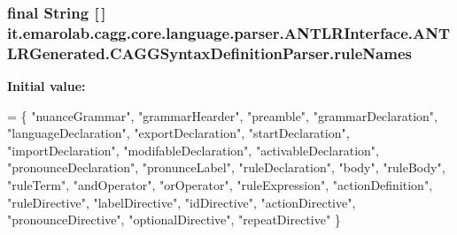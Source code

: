 \hypertarget{classit_1_1emarolab_1_1cagg_1_1core_1_1language_1_1parser_1_1ANTLRInterface_1_1ANTLRGenerated_1_1CAGGSyntaxDefinitionParser_afd9ffca04ae874a3ae506c1d068612dc}{
\subsubsection[{rule\-Names}]{\setlength{\rightskip}{0pt plus 5cm}final String \mbox{[}$\,$\mbox{]} it.\-emarolab.\-cagg.\-core.\-language.\-parser.\-A\-N\-T\-L\-R\-Interface.\-A\-N\-T\-L\-R\-Generated.\-C\-A\-G\-G\-Syntax\-Definition\-Parser.\-rule\-Names\hspace{0.3cm}{\ttfamily [static]}}}\label{classit_1_1emarolab_1_1cagg_1_1core_1_1language_1_1parser_1_1ANTLRInterface_1_1ANTLRGenerated_1_1CAGGSyntaxDefinitionParser_afd9ffca04ae874a3ae506c1d068612dc}
{\bfseries Initial value\-:}
\begin{DoxyCode}
= \{
        \textcolor{stringliteral}{"nuanceGrammar"}, \textcolor{stringliteral}{"grammarHearder"}, \textcolor{stringliteral}{"preamble"}, \textcolor{stringliteral}{"grammarDeclaration"}, \textcolor{stringliteral}{"languageDeclaration"}, 
        \textcolor{stringliteral}{"exportDeclaration"}, \textcolor{stringliteral}{"startDeclaration"}, \textcolor{stringliteral}{"importDeclaration"}, \textcolor{stringliteral}{"modifableDeclaration"}, 
        \textcolor{stringliteral}{"activableDeclaration"}, \textcolor{stringliteral}{"pronounceDeclaration"}, \textcolor{stringliteral}{"pronunceLabel"}, \textcolor{stringliteral}{"ruleDeclaration"}, 
        \textcolor{stringliteral}{"body"}, \textcolor{stringliteral}{"ruleBody"}, \textcolor{stringliteral}{"ruleTerm"}, \textcolor{stringliteral}{"andOperator"}, \textcolor{stringliteral}{"orOperator"}, \textcolor{stringliteral}{"ruleExpression"}, 
        \textcolor{stringliteral}{"actionDefinition"}, \textcolor{stringliteral}{"ruleDirective"}, \textcolor{stringliteral}{"labelDirective"}, \textcolor{stringliteral}{"idDirective"}, 
        \textcolor{stringliteral}{"actionDirective"}, \textcolor{stringliteral}{"pronounceDirective"}, \textcolor{stringliteral}{"optionalDirective"}, \textcolor{stringliteral}{"repeatDirective"}
    \}
\end{DoxyCode}


